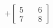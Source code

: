 \documentclass[preview]{standalone}
\begin{document}
\begin{align*}
+\begin{bmatrix} 5 & \quad 6 \\ 7 & \quad 8 \end{bmatrix}
\end{align*}
\end{document}
